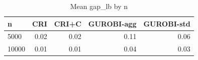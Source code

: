 \begin{table}[htbp]
\centering
\small
\caption{Mean gap\_lb by n}
\label{tab:E3x_long_runs_xlarge_b600_by_n}
\begin{tabular}{lrrrr}
\toprule
n & CRI & CRI+C & GUROBI-agg & GUROBI-std \\
\midrule
5000 & 0.02 & 0.02 & 0.11 & 0.06 \\
10000 & 0.01 & 0.01 & 0.04 & 0.03 \\
\bottomrule
\end{tabular}
\end{table}
